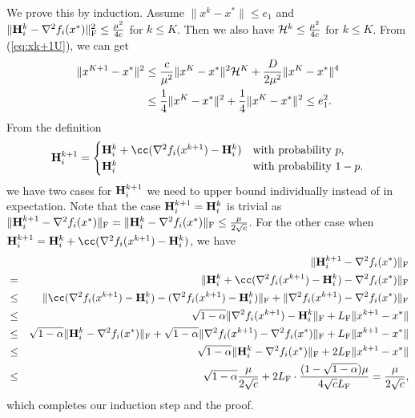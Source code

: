 \documentclass[11pt]{article}
\begin{document}
	We prove this by induction. Assume $\|x^k-x^*\| \le e_1$ and $\|\mathbf{H}_i^k - \nabla^2 f_i(x^*)\|^2_{\rm F}  \leq \frac{\mu^2}{4c}$ for $k\leq K$. Then we also have ${\cal H}^k \leq \frac{\mu^2}{4c}$ for $k\leq K$. From (\ref{eq:xk+1U}), we can get 
	\begin{align*}
		\|x^{K+1} - x^*\|^2 & \leq \frac{c}{\mu^2} \|x^K-x^*\|^2 {\cal H}^K + \frac{D}{2\mu^2} \|x^K-x^*\|^4 \\ 
		& \leq \frac{1}{4}\|x^K-x^*\|^2 + \frac{1}{4} \|x^K-x^*\|^2 \le e_1^2.
	\end{align*}
	From the definition
	\begin{equation}
		\mH_i^{k+1} =
		\begin{cases}
			\mH_i^k + \cc(\nabla^2 f_i(x^{k+1}) - \mH_i^k) & \text{with probability } p, \\
			\mH_i^k & \text{with probability } 1-p.
		\end{cases}
	\end{equation}
	we have two cases for $\mathbf{H}_i^{k+1}$ we need to upper bound individually instead of in expectation. Note that the case $\mathbf{H}_i^{k+1} = \mathbf{H}_i^{k}$ is trivial as $\|\mathbf{H}_i^{k+1} - \nabla^2 f_i(x^*)\|_{\rm F} = \|\mathbf{H}_i^{k} - \nabla^2 f_i(x^*)\|_{\rm F} \le \frac{\mu}{2\sqrt{c}}$. For the other case when $\mH_i^{k+1} = \mH_i^k + \cc(\nabla^2 f_i(x^{k+1}) - \mH_i^k)$, we have
	\begin{eqnarray*}
		&&\|\mH_i^{k+1} - \nabla^2 f_i(x^*)\|_{\rm F} \\
		&=& \|\mH_i^k + \cc(\nabla^2 f_i(x^{k+1}) - \mH_i^k) - \nabla^2 f_i(x^*)\|_{\rm F} \\
		&\le& \|\cc(\nabla^2 f_i(x^{k+1}) - \mH_i^k) - (\nabla^2 f_i(x^{k+1}) - \mH_i^k)\|_{\rm F} + \|\nabla^2 f_i(x^{k+1}) - \nabla^2 f_i(x^*)\|_{\rm F} \\
		&\le& \sqrt{1-\alpha}\|\nabla^2 f_i(x^{k+1}) - \mH_i^k\|_{\rm F} + \HF\|x^{k+1} - x^*\| \\
		&\le& \sqrt{1-\alpha}\|\mH_i^k - \nabla^2 f_i(x^*)\|_{\rm F} + \sqrt{1-\alpha}\|\nabla^2 f_i(x^{k+1}) - \nabla^2 f_i(x^*)\|_{\rm F} + \HF\|x^{k+1} - x^*\| \\
		&\le& \sqrt{1-\alpha}\|\mH_i^k - \nabla^2 f_i(x^*)\|_{\rm F} + 2\HF\|x^{k+1} - x^*\| \\
		&\le& \sqrt{1-\alpha}\frac{\mu}{2\sqrt{c}} + 2\HF\cdot\frac{(1-\sqrt{1-\alpha})\mu}{4\sqrt{c}\HF} = \frac{\mu}{2\sqrt{c}},
	\end{eqnarray*}
	which completes our induction step and the proof.
	
\end{document}
